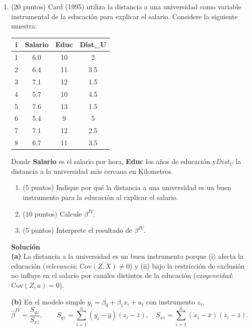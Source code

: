 \documentclass[10pt,a4paper]{article}
\begin{document}
\begin{enumerate}
    

\item (20 puntos) Card (1995) utiliza la distancia a una universidad como variable instrumental de la educación para explicar el salario. Considere la siguiente muestra:
\begin{center}
\begin{tabular}{|c|c|c|c|}
\hline
i & Salario & Educ & Dist_U \\
\hline
1 & 6.0 & 10 & 2 \\
2 & 6.4 & 11 & 3.5 \\
3 & 7.1 & 12 & 1.5 \\
4 & 5.7 & 10 & 4.5 \\
5 & 7.6 & 13 & 1.5 \\
6 & 5.4 &  9 & 5 \\
7 & 7.1 & 12 & 2.5 \\
8 & 6.7 & 11 & 3.5 \\
\hline
\end{tabular}
\end{center}
Donde \textbf{Salario} es el salario por hora, \textbf{Educ} los años de educación y\textbf{$Dist_U$} la distancia a la universidad más cercana en Kilometros.

\begin{enumerate}
    \item (5 puntos) Indique por qué la distancia a una universidad es un buen instrumento para la educación al explicar el salario.
    \item (10 puntos) Calcule \(\beta^{IV}\).
    \item (5 puntos) Interprete el resultado de \(\beta^{IV}\).
\end{enumerate}

\textbf{Solución}
\\


\textbf{(a)} La distancia a la universidad es un buen instrumento porque (i) afecta la educación (\emph{relevancia}: \(\mathrm{Cov}(Z,X)\neq 0\)) y (ii) bajo la restricción de exclusión no influye en el salario por canales distintos de la educación (\emph{exogeneidad}: \(\mathrm{Cov}(Z,u)=0\)).

\medskip
\textbf{(b)} En el modelo simple \(y_i=\beta_0+\beta_1 x_i+u_i\) con instrumento \(z_i\),
\[
\hat\beta^{IV}=\frac{S_{yz}}{S_{xz}},\qquad
S_{yz}=\sum_{i=1}^n (y_i-\bar y)(z_i-\bar z),\quad
S_{xz}=\sum_{i=1}^n (x_i-\bar x)(z_i-\bar z).
\]


\end{enumerate}
\end{document}
